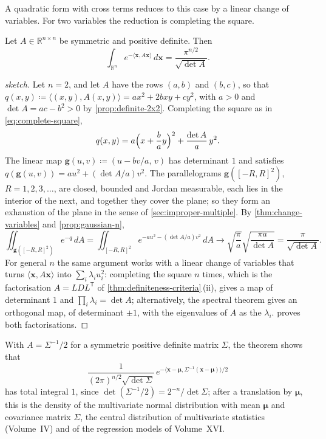 A quadratic form with cross terms reduces to this case by a linear change of variables. For two variables the reduction is completing the square.

\begin{theorem}
\label{thm:gaussian-quadratic}
Let $A\in\mathbb R^{n\times n}$ be symmetric and positive definite. Then
\[
\int_{\mathbb R^n}e^{-\langle\mathbf x,A\mathbf x\rangle}\,d\mathbf x=\frac{\pi^{n/2}}{\sqrt{\det A}} .
\]
\end{theorem}

\begin{proof}[sketch]
Let $n=2$, and let $A$ have the rows $(a,b)$ and $(b,c)$, so that $q(x,y)\coloneqq\langle(x,y),A(x,y)\rangle=ax^2+2bxy+cy^2$, with $a>0$ and $\det A=ac-b^2>0$ by \cref{prop:definite-2x2}. Completing the square as in \eqref{eq:complete-square},
\[
q(x,y)=a\Bigl(x+\frac bay\Bigr)^2+\frac{\det A}a\,y^2 .
\]
The linear map $\mathbf g(u,v)\coloneqq(u-bv/a,\,v)$ has determinant $1$ and satisfies $q(\mathbf g(u,v))=au^2+(\det A/a)v^2$. The parallelograms $\mathbf g([-R,R]^2)$, $R=1,2,3,\ldots$, are closed, bounded and Jordan measurable, each lies in the interior of the next, and together they cover the plane; so they form an exhaustion of the plane in the sense of \cref{sec:improper-multiple}. By \cref{thm:change-variables} and \cref{prop:gaussian-n},
\[
\iint_{\mathbf g([-R,R]^2)}e^{-q}\,dA=\iint_{[-R,R]^2}e^{-au^2-(\det A/a)v^2}\,dA\to\sqrt{\frac\pi a}\sqrt{\frac{\pi a}{\det A}}=\frac\pi{\sqrt{\det A}} .
\]
For general $n$ the same argument works with a linear change of variables that turns $\langle\mathbf x,A\mathbf x\rangle$ into $\sum_i\lambda_iu_i^2$: completing the square $n$ times, which is the factorisation $A=LDL^{\mathsf T}$ of \cref{thm:definiteness-criteria}\,(ii), gives a map of determinant $1$ and $\prod_i\lambda_i=\det A$; alternatively, the spectral theorem gives an orthogonal map, of determinant $\pm1$, with the eigenvalues of $A$ as the $\lambda_i$.  proves both factorisations.
\end{proof}

With $A=\Sigma^{-1}/2$ for a symmetric positive definite matrix $\Sigma$, the theorem shows that
\[
\frac1{(2\pi)^{n/2}\sqrt{\det\Sigma}}\,e^{-\langle\mathbf x-\boldsymbol\mu,\Sigma^{-1}(\mathbf x-\boldsymbol\mu)\rangle/2}
\]
has total integral $1$, since $\det(\Sigma^{-1}/2)=2^{-n}/\det\Sigma$; after a translation by $\boldsymbol\mu$, this is the density of the multivariate normal distribution with mean $\boldsymbol\mu$ and covariance matrix $\Sigma$, the central distribution of multivariate statistics (Volume~IV) and of the regression models of Volume~XVI.

